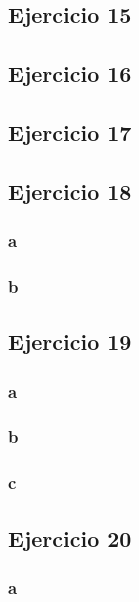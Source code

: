 \documentclass{article}
\begin{document}
\subsection*{Ejercicio 15}

\subsection*{Ejercicio 16}

\subsection*{Ejercicio 17}

\subsection*{Ejercicio 18}

\subsubsection*{a}

\subsubsection*{b}

\subsection*{Ejercicio 19}

\subsubsection*{a}

\subsubsection*{b}

\subsubsection*{c}

\subsection*{Ejercicio 20}

\subsubsection*{a}
\end{document}
